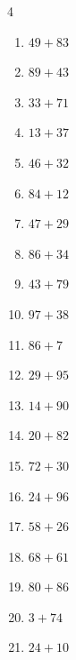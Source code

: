 \begin{multicols}{4}
\begin{enumerate}
  \item $49+83$
        \phantom{$=132$}

  \item $89+43$
        \phantom{$=132$}

  \item $33+71$
        \phantom{$=104$}

  \item $13+37$
        \phantom{$=50$}

  \item $46+32$
        \phantom{$=78$}

  \item $84+12$
        \phantom{$=96$}

  \item $47+29$
        \phantom{$=76$}

  \item $86+34$
        \phantom{$=120$}

  \item $43+79$
        \phantom{$=122$}

  \item $97+38$
        \phantom{$=135$}

  \item $86+7$
        \phantom{$=93$}

  \item $29+95$
        \phantom{$=124$}

  \item $14+90$
        \phantom{$=104$}

  \item $20+82$
        \phantom{$=102$}

  \item $72+30$
        \phantom{$=102$}

  \item $24+96$
        \phantom{$=120$}

\columnbreak %

  \item $58+26$
        \phantom{$=84$}

  \item $68+61$
        \phantom{$=129$}

  \item $80+86$
        \phantom{$=166$}

  \item $3+74$
        \phantom{$=77$}

  \item $24+10$
        \phantom{$=34$}


\end{enumerate}
\end{multicols}
